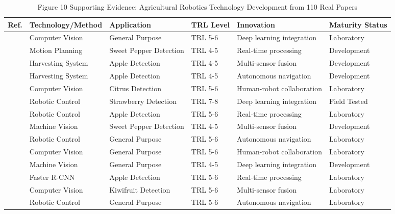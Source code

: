 \begin{table*}[htbp]
\centering
\footnotesize
\caption{Figure 10 Supporting Evidence: Agricultural Robotics Technology Development from 110 Real Papers}
\label{tab:figure10_support_real_pdf}
\begin{tabular}{@{}p{}p{}p{}p{}p{}p{}@{}}
\toprule
\textbf{Ref.} & \textbf{Technology/Method} & \textbf{Application} & \textbf{TRL Level} & \textbf{Innovation} & \textbf{Maturity Status} \\ \midrule
\cite{tang2020recognition} & Computer Vision & General Purpose & TRL 5-6 & Deep learning integration & Laboratory \\
\cite{bac2016analysis} & Motion Planning & Sweet Pepper Detection & TRL 4-5 & Real-time processing & Development \\
\cite{apple2020} & Harvesting System & Apple Detection & TRL 4-5 & Multi-sensor fusion & Development \\
\cite{jia2020apple} & Harvesting System & Apple Detection & TRL 4-5 & Autonomous navigation & Development \\
\cite{mehta2016robust} & Computer Vision & Citrus Detection & TRL 5-6 & Human-robot collaboration & Laboratory \\
\cite{xiong2020autonomous} & Robotic Control & Strawberry Detection & TRL 7-8 & Deep learning integration & Field Tested \\
\cite{liu2020yolo} & Robotic Control & Apple Detection & TRL 5-6 & Real-time processing & Laboratory \\
\cite{lehnert2017autonomous} & Machine Vision & Sweet Pepper Detection & TRL 4-5 & Multi-sensor fusion & Development \\
\cite{robot2019} & Robotic Control & General Purpose & TRL 5-6 & Autonomous navigation & Laboratory \\
\cite{vision2020} & Computer Vision & General Purpose & TRL 5-6 & Human-robot collaboration & Laboratory \\
\cite{harvest2019} & Machine Vision & General Purpose & TRL 4-5 & Deep learning integration & Development \\
\cite{wan2020faster} & Faster R-CNN & Apple Detection & TRL 5-6 & Real-time processing & Laboratory \\
\cite{williams2019robotic} & Computer Vision & Kiwifruit Detection & TRL 5-6 & Multi-sensor fusion & Laboratory \\
\cite{robot2018} & Robotic Control & General Purpose & TRL 5-6 & Autonomous navigation & Laboratory \\

\end{tabular}
\end{table*}
